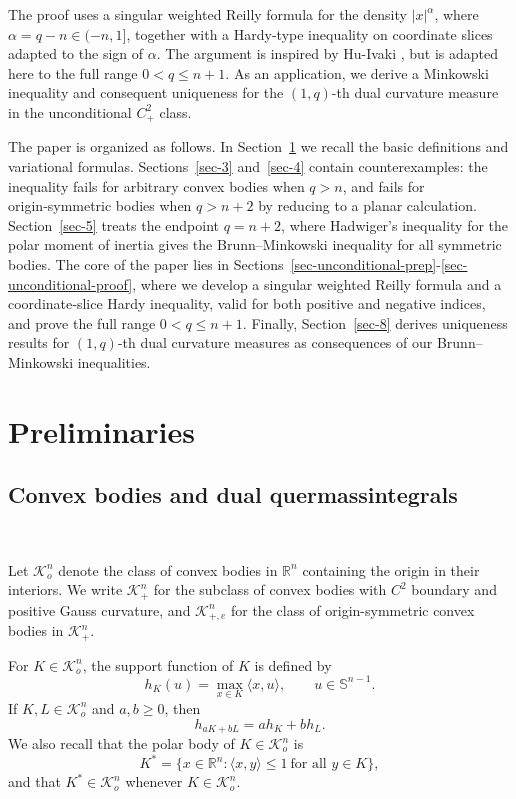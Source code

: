 \documentclass[12pt,leqno]{amsart}
\theoremstyle{plain} \newtheorem{thm}{Theorem}[section]
\theoremstyle{plain} \newtheorem{prop}[thm]{Proposition}
\theoremstyle{plain} \newtheorem{prob}[thm]{Problem}
\theoremstyle{definition} \newtheorem{defi}[thm]{Definition}
\theoremstyle{plain} \newtheorem{cor}[thm]{Corollary}
\theoremstyle{plain} \newtheorem{lem}[thm]{Lemma}
\theoremstyle{plain} \newtheorem{eg}{Example}[section]
\theoremstyle{remark} \newtheorem{rmk}[thm]{Remark}
\theoremstyle{plain} \newtheorem{conj}{Conjecture}
\numberwithin{equation}{section}
\newcommand{\bR}{\mathbb{R}}
\newcommand{\bS}{\mathbb{S}}
\newcommand{\cK}{\mathcal{K}}
\begin{document}
The proof uses a singular weighted Reilly formula for the density $|x|^\alpha$, where $\alpha=q-n\in(-n,1]$, together with a Hardy-type inequality on coordinate slices adapted to the sign of $\alpha$.
The argument is inspired by Hu-Ivaki \cite{HI26}, but is adapted here to the full range $0<q\le n+1$.
As an application, we derive a Minkowski inequality and consequent uniqueness for the $(1,q)$-th dual curvature measure in the unconditional $C^2_+$ class.


The paper is organized as follows. In Section~\ref{sec-2} we recall the basic definitions and variational formulas. Sections~\ref{sec-3} and~\ref{sec-4} contain counterexamples: the inequality fails for arbitrary convex bodies when $q>n$, and fails for origin‑symmetric bodies when $q>n+2$ by reducing to a planar calculation. Section~\ref{sec-5} treats the endpoint $q=n+2$, where Hadwiger's inequality for the polar moment of inertia gives the Brunn–Minkowski inequality for all symmetric bodies. The core of the paper lies in Sections~\ref{sec-unconditional-prep}-\ref{sec-unconditional-proof}, where we develop a singular weighted Reilly formula and a coordinate‑slice Hardy inequality, valid for both positive and negative indices, and prove the full range $0<q\le n+1$. Finally, Section~\ref{sec-8} derives uniqueness results for $(1,q)$-th dual curvature measures as consequences of our Brunn–Minkowski inequalities.

\section{Preliminaries}\label{sec-2}

\subsection{Convex bodies and dual quermassintegrals}\

Let $\cK_o^n$ denote the class of convex bodies in $\bR^n$ containing the origin in their interiors. We write $\cK_{+}^n$ for the subclass of convex bodies with $C^2$ boundary and positive Gauss curvature, and $\cK_{+,e}^n$ for the class of origin-symmetric convex bodies in $\cK_{+}^n$.

For $K\in \cK_o^n$, the support function of $K$ is defined by
\[
    h_K(u)=\max_{x\in K}\langle x,u\rangle,\qquad u\in \bS^{n-1}.
\]
If $K,L\in \cK_o^n$ and $a,b\geq 0$, then
\[
    h_{aK+bL}=ah_K+bh_L.
\]
We also recall that the polar body of $K\in\cK_o^n$ is
\[
K^\ast=\{x\in \bR^n:\langle x,y\rangle\le 1\ \text{for all }y\in K\},
\]
and that $K^\ast\in \cK_o^n$ whenever $K\in \cK_o^n$.
\end{document}
